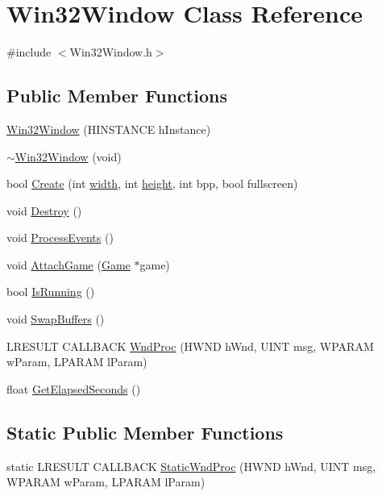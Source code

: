 \hypertarget{class_win32_window}{
\section{Win32Window Class Reference}
\label{class_win32_window}
}


{\ttfamily \#include $<$Win32Window.h$>$}

\subsection*{Public Member Functions}
\begin{DoxyCompactItemize}
\item 
\hyperlink{class_win32_window_aa35dcf493ad1afa40a834b99ee251042}{Win32Window} (HINSTANCE hInstance)
\item 
\hyperlink{class_win32_window_aaf37e216644b98bf2744dde43f7dfeb6}{$\sim$Win32Window} (void)
\item 
bool \hyperlink{class_win32_window_a1399e25540a585c07cc9f8d0dedfabe9}{Create} (int \hyperlink{wglext_8h_ae6531b1788ca42a9ae8155b0c52e7630}{width}, int \hyperlink{wglext_8h_ab2e63df950c3789599e1e43f477bc9e3}{height}, int bpp, bool fullscreen)
\item 
void \hyperlink{class_win32_window_a6545dfce322862ad6318eb6102d59e06}{Destroy} ()
\item 
void \hyperlink{class_win32_window_afbd2f2d46befc3b775883c82d564210c}{ProcessEvents} ()
\item 
void \hyperlink{class_win32_window_a53340f72e172303a30fc72161be4ac0a}{AttachGame} (\hyperlink{class_game}{Game} $\ast$game)
\item 
bool \hyperlink{class_win32_window_a881cc5d8e73332434b7596512c66b2ef}{IsRunning} ()
\item 
void \hyperlink{class_win32_window_a094c5c158c31c9d1d59f8727def85141}{SwapBuffers} ()
\item 
LRESULT CALLBACK \hyperlink{class_win32_window_ac17fafc962cee047adbdc883e4056544}{WndProc} (HWND hWnd, UINT msg, WPARAM wParam, LPARAM lParam)
\item 
float \hyperlink{class_win32_window_a5324132bf36ee37d8a3c6c064196b6f6}{GetElapsedSeconds} ()
\end{DoxyCompactItemize}
\subsection*{Static Public Member Functions}
\begin{DoxyCompactItemize}
\item 
static LRESULT CALLBACK \hyperlink{class_win32_window_a122b796d5a3953827f20f27fe921f449}{StaticWndProc} (HWND hWnd, UINT msg, WPARAM wParam, LPARAM lParam)
\end{DoxyCompactItemize}


